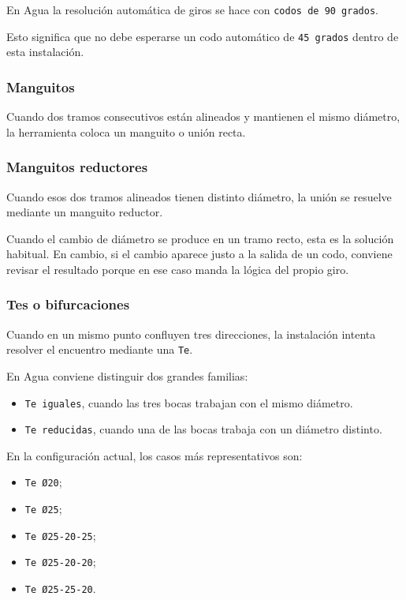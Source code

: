 En Agua la resolución automática de giros se hace con \texttt{codos de 90 grados}.

Esto significa que no debe esperarse un codo automático de \texttt{45 grados} dentro de esta instalación.


\subsubsection{Manguitos}

Cuando dos tramos consecutivos están alineados y mantienen el mismo diámetro, la herramienta coloca un manguito o unión recta.

\subsubsection{Manguitos reductores}

Cuando esos dos tramos alineados tienen distinto diámetro, la unión se resuelve mediante un manguito reductor.

Cuando el cambio de diámetro se produce en un tramo recto, esta es la solución habitual. En cambio, si el cambio aparece justo a la salida de un codo, conviene revisar el resultado porque en ese caso manda la lógica del propio giro.

\subsubsection{Tes o bifurcaciones}

Cuando en un mismo punto confluyen tres direcciones, la instalación intenta resolver el encuentro mediante una \texttt{Te}.

En Agua conviene distinguir dos grandes familias:

\begin{itemize}
\item \texttt{Te iguales}, cuando las tres bocas trabajan con el mismo diámetro.
\item \texttt{Te reducidas}, cuando una de las bocas trabaja con un diámetro distinto.
\end{itemize}

En la configuración actual, los casos más representativos son:

\begin{itemize}
\item \texttt{Te Ø20};
\item \texttt{Te Ø25};
\item \texttt{Te Ø25-20-25};
\item \texttt{Te Ø25-20-20};
\item \texttt{Te Ø25-25-20}.
\end{itemize}

